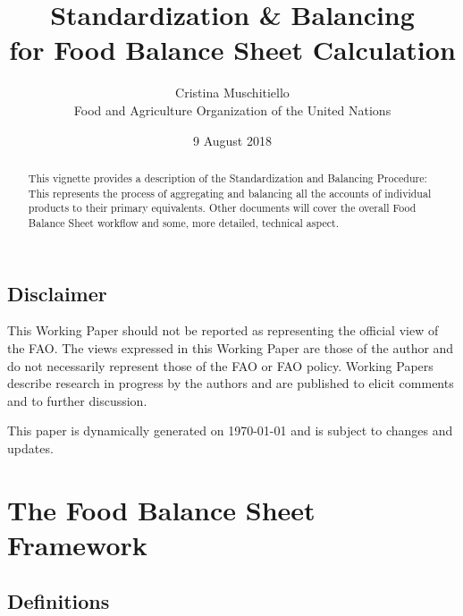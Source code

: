 \documentclass[]{article}
\title{Standardization \& Balancing\\
for Food Balance Sheet Calculation}
\author{Cristina Muschitiello\\
Food and Agriculture Organization of the United Nations}
\date{9 August 2018}
\begin{document}
\maketitle
\begin{abstract}
This vignette provides a description of the Standardization and
Balancing Procedure: This represents the process of aggregating and
balancing all the accounts of individual products to their primary
equivalents. Other documents will cover the overall Food Balance Sheet
workflow and some, more detailed, technical aspect.
\end{abstract}

{
\setcounter{tocdepth}{4}
\tableofcontents
}
\newpage

\listoftables

\listoffigures

\newpage

\subsection*{Disclaimer}\label{disclaimer}

This Working Paper should not be reported as representing the official
view of the FAO. The views expressed in this Working Paper are those of
the author and do not necessarily represent those of the FAO or FAO
policy. Working Papers describe research in progress by the authors and
are published to elicit comments and to further discussion.

This paper is dynamically generated on \today{} and is subject to
changes and updates.

\section*{The Food Balance Sheet
Framework}\label{the-food-balance-sheet-framework}

\subsection*{Definitions}\label{definitions}
\end{document}
